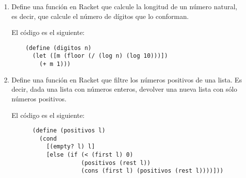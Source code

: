 \documentclass[11pt,letterpaper]{article}
\begin{document}
\begin{enumerate}
    \item Define una función en Racket que calcule la longitud de un número natural, es decir, que calcule el número de dígitos que lo conforman.

    El código es el siguiente:
    \begin{verbatim}
    (define (digitos n)
      (let ([m (floor (/ (log n) (log 10)))])
        (+ m 1)))
    \end{verbatim}

\item Define una función en Racket que filtre los números positivos de una
    lista. Es decir, dada una lista con números enteros, devolver una nueva
    lista con sólo números positivos.
    
      El código es el siguiente:
      \begin{verbatim}
      (define (positivos l)
        (cond
          [(empty? l) l]
          [else (if (< (first l) 0)
                    (positivos (rest l))
                    (cons (first l) (positivos (rest l))))]))
      \end{verbatim}
      
\end{enumerate}
\end{document}
